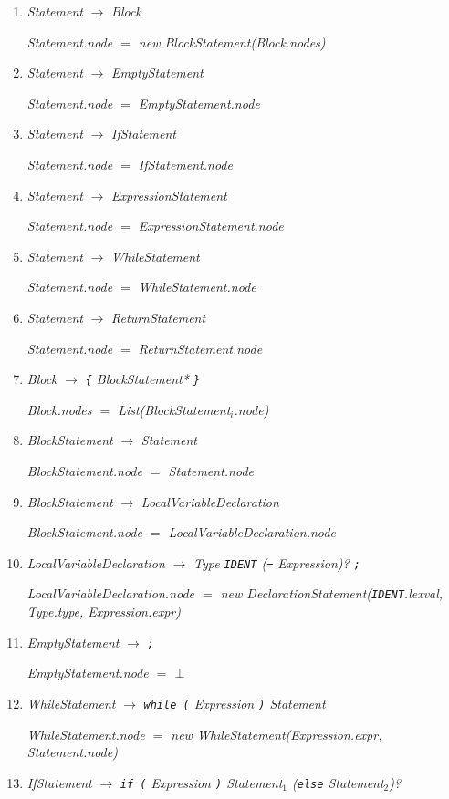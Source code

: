 \documentclass[12pt,a4paper]{scrartcl}
\renewcommand{\prod}[2]{\textit{#1} $\rightarrow$ \textit{#2}}
\newcommand{\tok}[1]{\textnormal{\texttt{#1}}}
\newcommand{\assign}[2]{\textit{#1} $=$ #2}
\newcommand{\List}[1]{\textnormal{List(\textit{#1})}}
\newcommand{\new}[2]{\textnormal{new #1(\textit{#2})}}
\newcommand{\attr}[1]{\parbox{\linewidth}{\raggedleft \textit{#1}}}
\begin{document}
\begin{enumerate}
    \item \prod{Statement}{Block}\\
        \attr{\assign{Statement.node}{\new{BlockStatement}{Block.nodes}}}
    \item \prod{Statement}{EmptyStatement}\\
        \attr{\assign{Statement.node}{EmptyStatement.node}}
    \item \prod{Statement}{IfStatement}\\
        \attr{\assign{Statement.node}{IfStatement.node}}
    \item \prod{Statement}{ExpressionStatement}\\
        \attr{\assign{Statement.node}{ExpressionStatement.node}}
    \item \prod{Statement}{WhileStatement}\\
        \attr{\assign{Statement.node}{WhileStatement.node}}
    \item \prod{Statement}{ReturnStatement}\\
        \attr{\assign{Statement.node}{ReturnStatement.node}}
    \item \prod{Block}{\tok{\{} BlockStatement* \tok{\}}}\\
        \attr{\assign{Block.nodes}{\List{BlockStatement$_i$.node}}}
    \item \prod{BlockStatement}{Statement}\\
        \attr{\assign{BlockStatement.node}{Statement.node}}
    \item \prod{BlockStatement}{LocalVariableDeclaration}\\
        \attr{\assign{BlockStatement.node}{LocalVariableDeclaration.node}}
    \item \prod{LocalVariableDeclaration}{Type \tok{IDENT} (\tok{=} Expression)? \tok{;}}\\
        \attr{\assign{LocalVariableDeclaration.node}{\new{DeclarationStatement}{\tok{IDENT}.lexval, Type.type, Expression.expr}}}
    \item \prod{EmptyStatement}{\tok{;}}\\
        \attr{\assign{EmptyStatement.node}{$\bot$}}
    \item \prod{WhileStatement}{\tok{while (} Expression \tok{)} Statement}\\
        \attr{\assign{WhileStatement.node}{\new{WhileStatement}{Expression.expr, Statement.node}}}
    \item \prod{IfStatement}{\tok{if (} Expression \tok{)} Statement$_1$ (\tok{else} Statement$_2$)?}\\

\end{enumerate}
\end{document}
